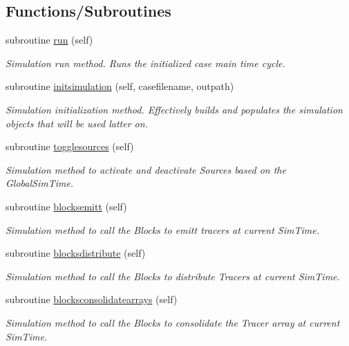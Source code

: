 \subsection*{Functions/\+Subroutines}
\begin{DoxyCompactItemize}
\item 
subroutine \mbox{\hyperlink{namespacesimulation__mod_a73bd78c4ac76c51f1e10f5847c25c4df}{run}} (self)
\begin{DoxyCompactList}\small\item\em Simulation run method. Runs the initialized case main time cycle. \end{DoxyCompactList}\item 
subroutine \mbox{\hyperlink{namespacesimulation__mod_aedbba2bb458cbcd7eb93938a5f7b5940}{initsimulation}} (self, casefilename, outpath)
\begin{DoxyCompactList}\small\item\em Simulation initialization method. Effectively builds and populates the simulation objects that will be used latter on. \end{DoxyCompactList}\item 
subroutine \mbox{\hyperlink{namespacesimulation__mod_a87a5141e4516b9610a6e4f0d2ff2d719}{togglesources}} (self)
\begin{DoxyCompactList}\small\item\em Simulation method to activate and deactivate Sources based on the GlobalSim\+Time. \end{DoxyCompactList}\item 
subroutine \mbox{\hyperlink{namespacesimulation__mod_a13aa0745f4601e3f418143dab2f18276}{blocksemitt}} (self)
\begin{DoxyCompactList}\small\item\em Simulation method to call the Blocks to emitt tracers at current Sim\+Time. \end{DoxyCompactList}\item 
subroutine \mbox{\hyperlink{namespacesimulation__mod_a058892630af07fc0fe8a4bffec531c6a}{blocksdistribute}} (self)
\begin{DoxyCompactList}\small\item\em Simulation method to call the Blocks to distribute Tracers at current Sim\+Time. \end{DoxyCompactList}\item 
subroutine \mbox{\hyperlink{namespacesimulation__mod_ac838d4afe33303dc49a5790ca957baa1}{blocksconsolidatearrays}} (self)
\begin{DoxyCompactList}\small\item\em Simulation method to call the Blocks to consolidate the Tracer array at current Sim\+Time. \end{DoxyCompactList}\item 

\end{DoxyCompactItemize}
